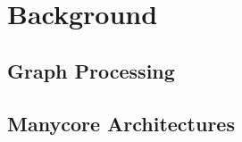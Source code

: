 
\section{Background} \label{sec:background}
\subsection{Graph Processing}
\subsection{Manycore Architectures}